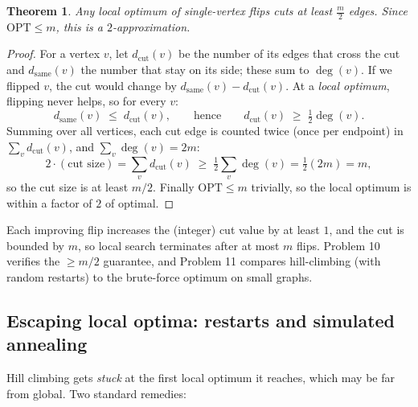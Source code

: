 \documentclass[11pt]{article}
\newtheorem{theorem}{Theorem}[section]
\begin{document}
\begin{theorem}
\label{thm:maxcut}
Any local optimum of single-vertex flips cuts at least $\tfrac{m}{2}$ edges. Since
$\mathrm{OPT} \le m$, this is a $2$-approximation.
\end{theorem}

\begin{proof}
For a vertex $v$, let $d_{\mathrm{cut}}(v)$ be the number of its edges that cross the cut
and $d_{\mathrm{same}}(v)$ the number that stay on its side; these sum to $\deg(v)$. If we
flipped $v$, the cut would change by $d_{\mathrm{same}}(v) - d_{\mathrm{cut}}(v)$. At a
\emph{local optimum}, flipping never helps, so for every $v$:
\[
    d_{\mathrm{same}}(v) \;\le\; d_{\mathrm{cut}}(v),
    \qquad\text{hence}\qquad d_{\mathrm{cut}}(v) \;\ge\; \tfrac{1}{2}\deg(v).
\]
Summing over all vertices, each cut edge is counted twice (once per endpoint) in $\sum_v
d_{\mathrm{cut}}(v)$, and $\sum_v \deg(v) = 2m$:
\[
    2 \cdot (\text{cut size}) = \sum_v d_{\mathrm{cut}}(v) \;\ge\; \tfrac12 \sum_v \deg(v)
    = \tfrac12 (2m) = m,
\]
so the cut size is at least $m/2$. Finally $\mathrm{OPT} \le m$ trivially, so the local
optimum is within a factor of $2$ of optimal.
\end{proof}

Each improving flip increases the (integer) cut value by at least $1$, and the cut is
bounded by $m$, so local search terminates after at most $m$ flips. Problem 10 verifies
the $\ge m/2$ guarantee, and Problem 11 compares hill-climbing (with random restarts) to
the brute-force optimum on small graphs.

\subsection{Escaping local optima: restarts and simulated annealing}

Hill climbing gets \emph{stuck} at the first local optimum it reaches, which may be far
from global. Two standard remedies:
\end{document}
